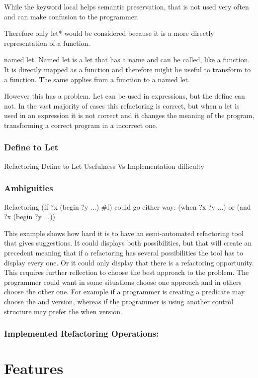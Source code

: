 While the keyword local helps semantic preservation, that is not used very often and can make confusion to the programmer.

Therefore only let* would be considered because it is a more directly representation of a function.

named let.
Named let is a let that has a name and can be called, like a function.
It is directly mapped as a function and therefore might be useful to transform to a function.
The same applies from a function to a named let.

However this has a problem. Let can be used in expressions, but the define can not.
In the vast majority of cases this refactoring is correct, but when a let is used in an expression
it is not correct and it changes the meaning of the program, transforming a correct
program in a incorrect one.
\subsubsection{Define to Let}
Refactoring Define to Let Usefulness Vs Implementation difficulty

\subsubsection{Ambiguities}
Refactoring (if ?x (begin ?y ...) \#f) could go either way:
(when ?x ?y ...)
or
(and ?x (begin ?y ...))

This example shows how hard it is to have an semi-automated refactoring tool
that gives suggestions. It could displays both possibilities, but that will
create an precedent meaning that if a refactoring has several possibilities the
tool has to display every one. Or it could only display that there is a
refactoring opportunity. This requires further reflection to choose the best
approach to the problem.
The programmer could want in some situations choose one approach and in others
choose the other one. For example if a programmer is creating a predicate may
choose the and version, whereas if the programmer is using another control structure
may prefer the when version.

\subsubsection{Implemented Refactoring Operations:}

\section{Features}

